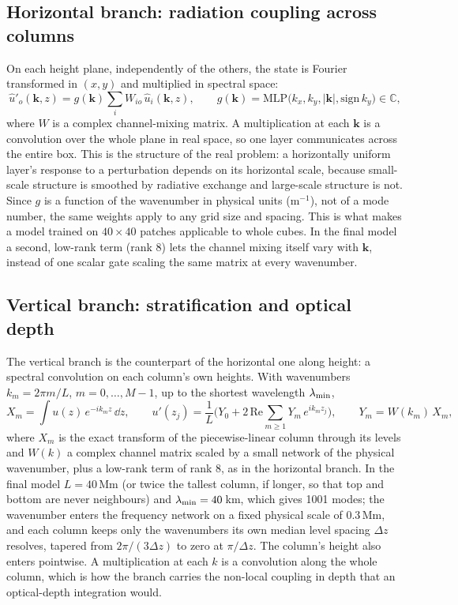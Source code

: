 \subsection{Horizontal branch: radiation coupling across columns}\label{sec:horizontal}
On each height plane, independently of the others, the state is Fourier transformed in $(x,y)$ and multiplied in spectral space:
\begin{equation}
\hat u'_o(\mathbf k,z)=g(\mathbf k)\sum_i W_{io}\,\hat u_i(\mathbf k,z),\qquad g(\mathbf k)=\mathrm{MLP}\big(k_x,k_y,|\mathbf k|,\mathrm{sign}\,k_y\big)\in\mathbb C,
\end{equation}
where $W$ is a complex channel-mixing matrix. A multiplication at each $\mathbf k$ is a convolution over the whole plane in real space, so one layer communicates across the entire box. This is the structure of the real problem: a horizontally uniform layer's response to a perturbation depends on its horizontal scale, because small-scale structure is smoothed by radiative exchange and large-scale structure is not. Since $g$ is a function of the wavenumber in physical units (m$^{-1}$), not of a mode number, the same weights apply to any grid size and spacing. This is what makes a model trained on $40\times40$ patches applicable to whole cubes. In the final model a second, low-rank term (rank 8) lets the channel mixing itself vary with $\mathbf k$, instead of one scalar gate scaling the same matrix at every wavenumber.

\subsection{Vertical branch: stratification and optical depth}\label{sec:vertical}
The vertical branch is the counterpart of the horizontal one along height: a spectral convolution on each column's own heights. With wavenumbers $k_m=2\pi m/L$, $m=0,\dots,M-1$, up to the shortest wavelength $\lambda_{\rm min}$,
\begin{equation}
X_m=\int u(z)\,e^{-ik_mz}\,\dd z,\qquad u'(z_j)=\frac1L\Big(Y_0+2\,\mathrm{Re}\sum_{m\ge1}Y_m\,e^{ik_mz_j}\Big),\qquad Y_m=W(k_m)\,X_m,
\end{equation}
where $X_m$ is the exact transform of the piecewise-linear column through its levels and $W(k)$ a complex channel matrix scaled by a small network of the physical wavenumber, plus a low-rank term of rank 8, as in the horizontal branch. In the final model $L=40$\,Mm (or twice the tallest column, if longer, so that top and bottom are never neighbours) and $\lambda_{\rm min}=40$\,km, which gives 1001 modes; the wavenumber enters the frequency network on a fixed physical scale of 0.3\,Mm, and each column keeps only the wavenumbers its own median level spacing $\Delta z$ resolves, tapered from $2\pi/(3\Delta z)$ to zero at $\pi/\Delta z$. The column's height also enters pointwise. A multiplication at each $k$ is a convolution along the whole column, which is how the branch carries the non-local coupling in depth that an optical-depth integration would.

